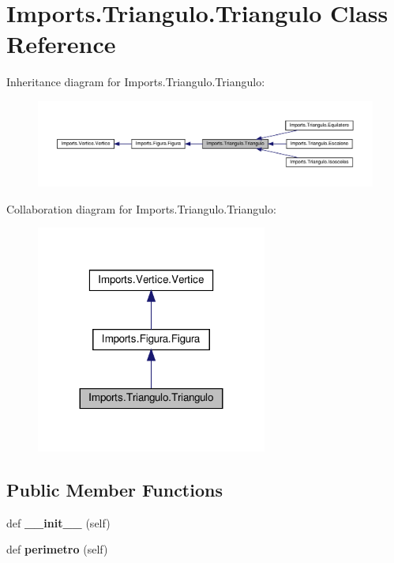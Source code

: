 \hypertarget{class_imports_1_1_triangulo_1_1_triangulo}{}\section{Imports.\+Triangulo.\+Triangulo Class Reference}
\label{class_imports_1_1_triangulo_1_1_triangulo}


Inheritance diagram for Imports.\+Triangulo.\+Triangulo\+:
\nopagebreak
\begin{figure}[H]
\begin{center}
\leavevmode
\includegraphics[width=350pt]{class_imports_1_1_triangulo_1_1_triangulo__inherit__graph}
\end{center}
\end{figure}


Collaboration diagram for Imports.\+Triangulo.\+Triangulo\+:
\nopagebreak
\begin{figure}[H]
\begin{center}
\leavevmode
\includegraphics[width=215pt]{class_imports_1_1_triangulo_1_1_triangulo__coll__graph}
\end{center}
\end{figure}
\subsection*{Public Member Functions}
\begin{DoxyCompactItemize}
\item 
\mbox{\label{class_imports_1_1_triangulo_1_1_triangulo_aca2395c6ea6b671b4d1f809e6ca4614a}} 
def {\bfseries \+\_\+\+\_\+init\+\_\+\+\_\+} (self)
\item 
\mbox{\label{class_imports_1_1_triangulo_1_1_triangulo_a45012d511c1137466dc9dc9138f111d6}} 
def {\bfseries perimetro} (self)
\end{DoxyCompactItemize}
